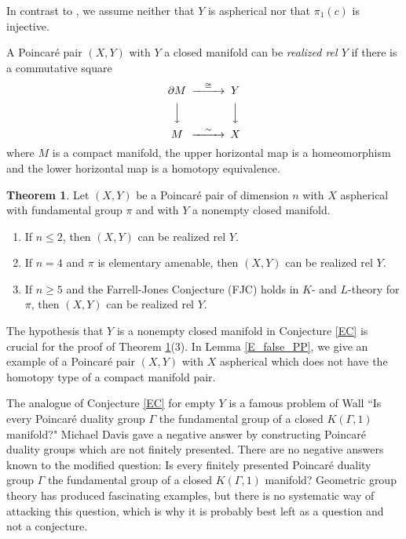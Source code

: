 \documentclass[12pt]{amsart}
\theoremstyle{definition}
\newtheorem{maintheorem}{Theorem}
\begin{document}
 In contrast to \cite{BE}, we assume neither that $Y$ is aspherical nor that $\pi_1(c)$ is injective.


A Poincar\'e pair $(X,Y)$ with $Y$  a closed manifold can be {\em  realized rel $Y$} if there is a commutative square 
$$
\begin{CD}
\partial M @>\cong>> Y\\
@VVV @VVV \\
M @>\sim>> X
\end{CD}
$$
where $M$ is a compact manifold, the upper horizontal map is a homeomorphism and the lower horizontal map is a homotopy equivalence. 

\begin{maintheorem} \label{ET}
Let $(X,Y)$ be a Poincar\'e pair of dimension $n$ with $X$ aspherical  with fundamental group $\pi$ and with $Y$ a nonempty closed manifold.
\begin{enumerate}
\item If $n \leq 2$, then $(X,Y)$ can be realized rel $Y$.
 \item If $n = 4$ and $\pi$ is elementary amenable, then $(X,Y)$ can be realized rel $Y$.
 \item If $n \geq 5$ and the Farrell-Jones Conjecture (FJC) holds in $K$- and $L$-theory for $\pi$, then $(X,Y)$ can be realized rel $Y$.
\end{enumerate}
\end{maintheorem}




The hypothesis that $Y$ is a nonempty closed manifold  in Conjecture \ref{EC} is crucial for the proof of Theorem \ref{ET}(3).   In Lemma \ref{E_false_PP}, we give an example of a Poincar\'e pair $(X,Y)$ with $X$ aspherical which does not have the homotopy type of a compact manifold pair.

The analogue of Conjecture \ref{EC} for empty $Y$ is a famous problem of Wall \cite[page 391]{Wall79} ``Is every Poincar\'e duality group $\Gamma$ the fundamental group of a closed $K(\Gamma,1)$ manifold?"  Michael Davis \cite[Theorem C]{Davis98} gave a negative answer by constructing Poincar\'e duality groups which are not finitely presented.   There are no negative answers known to the modified question: Is every finitely presented Poincar\'e duality group $\Gamma$ the fundamental group of a closed $K(\Gamma,1)$ manifold?   Geometric group theory \cite{Davis00} has produced fascinating examples, but there is no systematic way of attacking this question, which is why it is probably best left as a question and not a conjecture.
\end{document}
